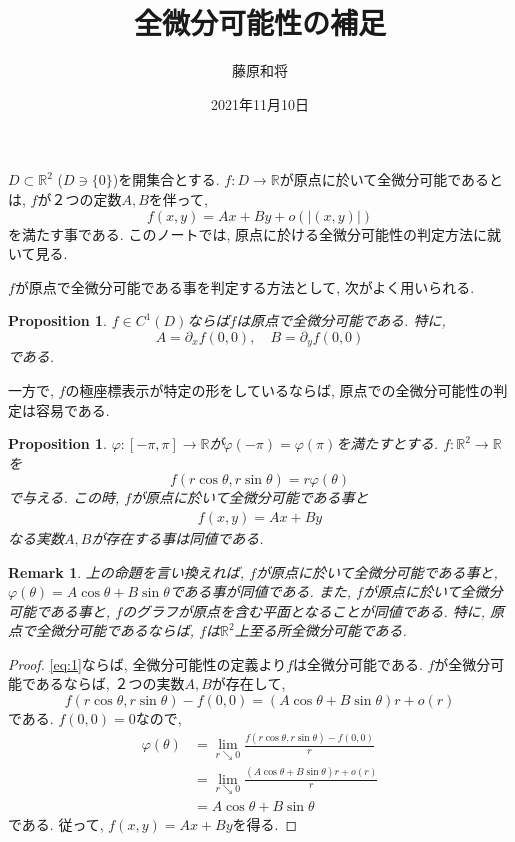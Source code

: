 \documentclass{bxjsarticle}
\newtheorem{Proposition}[Theorem]{Proposition}
\newtheorem{Remark}{Remark}%
\begin{document}
\title{全微分可能性の補足}
\author{藤原和将}
\date{2021年11月10日}
\maketitle

$D ⊂ ℝ^2$ ($D ∋ \{0\}$)を開集合とする.
$f: D → ℝ$が原点に於いて全微分可能であるとは,
$f$が２つの定数$A, B$を伴って,
	\[
	f(x,y)
	=Ax + By + o(|(x,y)|)
	\]
を満たす事である.
このノートでは,
原点に於ける全微分可能性の判定方法に就いて見る.

$f$が原点で全微分可能である事を判定する方法として,
次がよく用いられる.

\begin{Proposition}
\label{P:C1}
$f ∈ C^1(D)$ならば$f$は原点で全微分可能である.
特に,
	\[
	A = ∂_x f(0,0),\quad
	B = ∂_y f(0,0)
	\]
である.
\end{Proposition}

一方で, $f$の極座標表示が特定の形をしているならば,
原点での全微分可能性の判定は容易である.

\begin{Proposition}
\label{P:Rad}
$φ: [-π,π] → ℝ$が$φ(-π)=φ(π)$を満たすとする.
$f : ℝ^2 → ℝ$を
	\[
	f(r \cos θ, r \sin θ) = r φ (θ)
	\]
で与える.
この時, $f$が原点に於いて全微分可能である事と
	\begin{align}
	f(x,y) = A x + B y
	\label{eq:1}
	\end{align}
なる実数$A,B$が存在する事は同値である.
\end{Proposition}

\begin{Remark}
上の命題を言い換えれば,
$f$が原点に於いて全微分可能である事と, $φ(θ) = A \cos θ + B \sin θ$である事が同値である.
また, $f$が原点に於いて全微分可能である事と,
$f$のグラフが原点を含む平面となることが同値である.
特に, 原点で全微分可能であるならば,
$f$は$ℝ^2$上至る所全微分可能である.
\end{Remark}

\begin{proof}
\eqref{eq:1}ならば,
全微分可能性の定義より$f$は全微分可能である.
$f$が全微分可能であるならば,
２つの実数$A,B$が存在して,
	\[
	f(r \cos θ, r \sin θ) - f(0,0)
	= ( A \cos θ + B \sin θ ) r + o(r)
	\]
である.
$f(0,0)=0$なので,
	\begin{align*}
	φ(θ)
	&= \lim_{r ↘ 0} \frac{f(r \cos θ, r \sin θ)-f(0,0)}{r}\\
	&= \lim_{r ↘ 0} \frac{( A \cos θ + B \sin θ ) r + o(r)}{r}\\
	&= A \cos θ + B \sin θ
	\end{align*}
である.
従って, $f(x,y)=Ax+By$を得る.
\end{proof}
\end{document}
